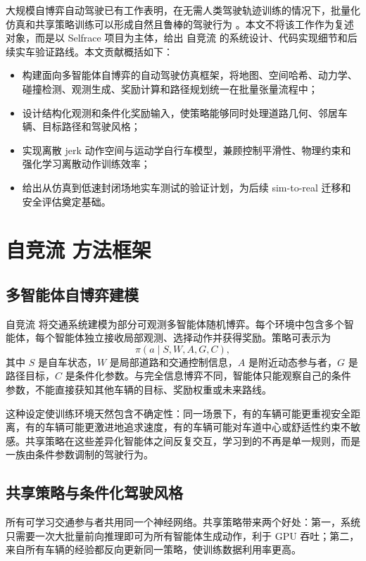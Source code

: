 \documentclass[preprint,12pt]{elsarticle}
\newcommand{\Selfrace}{Selfrace}
\newcommand{\Zijingliu}{自竞流}
\begin{document}
大规模自博弈自动驾驶已有工作表明，在无需人类驾驶轨迹训练的情况下，批量化仿真和共享策略训练可以形成自然且鲁棒的驾驶行为 \citep{cusumano2025robust}。本文不将该工作作为复述对象，而是以 \Selfrace{} 项目为主体，给出 \Zijingliu{} 的系统设计、代码实现细节和后续实车验证路线。本文贡献概括如下：
\begin{itemize}
  \item 构建面向多智能体自博弈的自动驾驶仿真框架，将地图、空间哈希、动力学、碰撞检测、观测生成、奖励计算和路径规划统一在批量张量流程中；
  \item 设计结构化观测和条件化奖励输入，使策略能够同时处理道路几何、邻居车辆、目标路径和驾驶风格；
  \item 实现离散 jerk 动作空间与运动学自行车模型，兼顾控制平滑性、物理约束和强化学习离散动作训练效率；
  \item 给出从仿真到低速封闭场地实车测试的验证计划，为后续 sim-to-real 迁移和安全评估奠定基础。
\end{itemize}

\section{\Zijingliu{} 方法框架}

\subsection{多智能体自博弈建模}

\Zijingliu{} 将交通系统建模为部分可观测多智能体随机博弈。每个环境中包含多个智能体，每个智能体独立接收局部观测、选择动作并获得奖励。策略可表示为
\begin{equation}
  \pi(a \mid S, W, A, G, C),
\end{equation}
其中 $S$ 是自车状态，$W$ 是局部道路和交通控制信息，$A$ 是附近动态参与者，$G$ 是路径目标，$C$ 是条件化参数。与完全信息博弈不同，智能体只能观察自己的条件参数，不能直接获知其他车辆的目标、奖励权重或未来路线。

这种设定使训练环境天然包含不确定性：同一场景下，有的车辆可能更重视安全距离，有的车辆可能更激进地追求速度，有的车辆可能对车道中心或舒适性约束不敏感。共享策略在这些差异化智能体之间反复交互，学习到的不再是单一规则，而是一族由条件参数调制的驾驶行为。

\subsection{共享策略与条件化驾驶风格}

所有可学习交通参与者共用同一个神经网络。共享策略带来两个好处：第一，系统只需要一次大批量前向推理即可为所有智能体生成动作，利于 GPU 吞吐；第二，来自所有车辆的经验都反向更新同一策略，使训练数据利用率更高。
\end{document}
